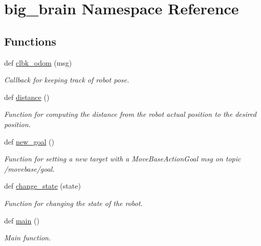 \hypertarget{namespacebig__brain}{}\section{big\+\_\+brain Namespace Reference}
\label{namespacebig__brain}
\subsection*{Functions}
\begin{DoxyCompactItemize}
\item 
def \hyperlink{namespacebig__brain_a815c120863ef1a5db7bf743bc9bb6f54}{clbk\+\_\+odom} (msg)
\begin{DoxyCompactList}\small\item\em Callback for keeping track of robot pose. \end{DoxyCompactList}\item 
def \hyperlink{namespacebig__brain_adfc26e0690fd9fe893e09be5400a8b7d}{distance} ()
\begin{DoxyCompactList}\small\item\em Function for computing the distance from the robot actual position to the desired position. \end{DoxyCompactList}\item 
def \hyperlink{namespacebig__brain_a4f091a106e4ba678afd9bc2df4f2789b}{new\+\_\+goal} ()
\begin{DoxyCompactList}\small\item\em Function for setting a new target with a Move\+Base\+Action\+Goal msg on topic /movebase/goal. \end{DoxyCompactList}\item 
def \hyperlink{namespacebig__brain_a108d0111d106a89cde8da1c2f494ab3c}{change\+\_\+state} (state)
\begin{DoxyCompactList}\small\item\em Function for changing the state of the robot. \end{DoxyCompactList}\item 
def \hyperlink{namespacebig__brain_a06516fa995f70f4013ee893ae15c5cea}{main} ()
\begin{DoxyCompactList}\small\item\em Main function. \end{DoxyCompactList}\end{DoxyCompactItemize}

